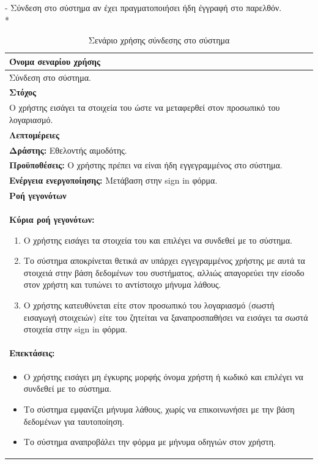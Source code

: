 \newpage
- Σύνδεση στο σύστημα αν έχει πραγματοποιήσει ήδη έγγραφή στο παρελθόν.
\\*
\begin{table}[H]	
	\begin{center}
	    \begin{tabular}{|p{\dimexpr \linewidth-2\tabcolsep}|}
	    \hline
	    \rowcolor{grayy}
	    \textbf{Όνομα σεναρίου χρήσης}
	    \\ \hline    
	    Σύνδεση στο σύστημα.
	     \\ \hline
	    \rowcolor{grayy}
	    \textbf{\textbf{Στόχος}}
	    \\ \hline
		Ο χρήστης εισάγει τα στοιχεία του ώστε να μεταφερθεί στον προσωπικό του λογαριασμό.
	    \\ \hline
	    \rowcolor{grayy}
	    \textbf{Λεπτομέρειες}
	    \\ \hline
		\textbf{Δράστης:} Εθελοντής αιμοδότης.
		\\*
		\textbf{Προϋποθέσεις:} Ο χρήστης πρέπει να είναι ήδη εγγεγραμμένος στο σύστημα.
		\\*
		\textbf{Ενέργεια ενεργοποίησης:} Μετάβαση στην sign in φόρμα.
		\\ \hline
		\rowcolor{grayy}    
	    \textbf{Ροή γεγονότων}
	    \\ \hline
		\textbf{Κύρια ροή γεγονότων:}
		\begin{enumerate}
			\item	Ο χρήστης εισάγει τα στοιχεία του και επιλέγει να συνδεθεί με το σύστημα.
			\item Το σύστημα αποκρίνεται θετικά αν υπάρχει εγγεγραμμένος  χρήστης με αυτά τα στοιχειά στην βάση δεδομένων του συστήματος, αλλιώς απαγορεύει
		την είσοδο στον χρήστη και τυπώνει το αντίστοιχο μήνυμα λάθους.
			\item	Ο χρήστης κατευθύνεται είτε στον προσωπικό του λογαριασμό (σωστή εισαγωγή στοιχειών) είτε του ζητείται να ξαναπροσπαθήσει να εισάγει τα σωστά στοιχεία στην sign in φόρμα.
		\end{enumerate}
		\\ \hline
		\rowcolor{grayy}
		\textbf{Επεκτάσεις:}
		\\ \hline
		\begin{itemize}
		\item Ο χρήστης εισάγει μη έγκυρης  μορφής όνομα χρήστη ή κωδικό και επιλέγει να συνδεθεί με το σύστημα.
		\item Το σύστημα εμφανίζει μήνυμα λάθους, χωρίς να επικοινωνήσει με την βάση δεδομένων για ταυτοποίηση.
		\item Το σύστημα αναπροβάλει την φόρμα με μήνυμα οδηγιών στον χρήστη.
		\end{itemize}
		\\ \hline
	    \end{tabular}
	    \caption{Σενάριο χρήσης σύνδεσης στο σύστημα}
	    \label{tab:user_sign_in} 	
	\end{center}
\end{table}

